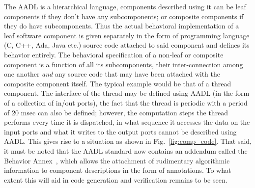 The AADL is a hierarchical language, components described using it can
be leaf components if they don't have any subcomponents; or composite
components if they do have subcomponents. Thus the actual behavioral
implementation of a leaf software component is given separately in the
form of programming language (C, C++, Ada, Java etc.) source code
attached to said component and defines its behavior entirely. The
behavioral specification of a non-leaf or composite component is a
function of all its subcomponents, their inter-connection among one
another \emph{and} any source code that may have been attached with
the composite component itself. The typical example would be that of a
thread component. The interface of the thread may be defined using
AADL (in the form of a collection of in/out ports), the fact that the
thread is periodic with a period of 20 msec can also be defined;
however, the computation steps the thread performs every time it is
dispatched, in what sequence it accesses the data on the input ports
and what it writes to the output ports cannot be described using
AADL. This gives rise to a situation as shown in
Fig.~\ref{fig:comp_code}. That said, it must be noted that the AADL
standard now contains an addendum called the Behavior
Annex~\cite{filali@iceccs07}, which allows the attachment of
rudimentary algorithmic information to component descriptions in the
form of annotations. To what extent this will aid in code generation
and verification remains to be seen.

